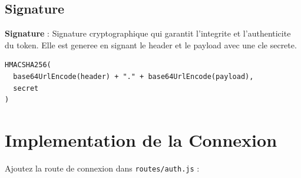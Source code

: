 \documentclass[a4paper,12pt]{book}
\begin{document}
\subsection{Signature}

\begin{definitionbox}
    \textbf{Signature} : Signature cryptographique qui garantit l'integrite et l'authenticite du token. Elle est generee en signant le header et le payload avec une cle secrete.
\end{definitionbox}

\begin{lstlisting}[style=javascript]
HMACSHA256(
  base64UrlEncode(header) + "." + base64UrlEncode(payload),
  secret
)
\end{lstlisting}

\section{Implementation de la Connexion}

Ajoutez la route de connexion dans \texttt{routes/auth.js} :
\end{document}
